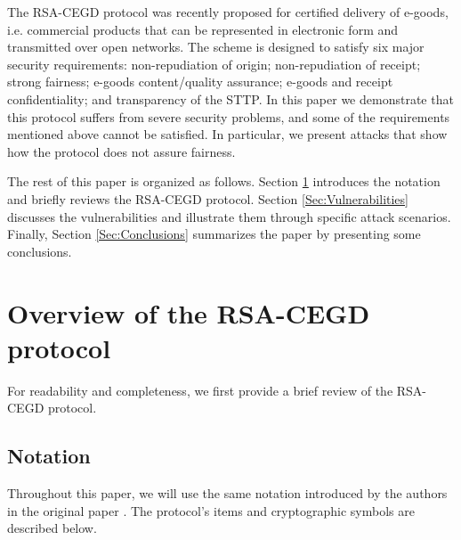 \documentclass{article}
\begin{document}
The RSA-CEGD protocol \cite{NZCG04} was recently proposed for
certified delivery of e-goods, i.e. commercial products that can be
represented in electronic form and transmitted over open networks.
The scheme is designed to satisfy six major security requirements:
non-repudiation of origin; non-repudiation of receipt; strong
fairness; e-goods content/quality assurance; e-goods and receipt
confidentiality; and transparency of the STTP. In this paper we
demonstrate that this protocol suffers from severe security
problems, and some of the requirements mentioned above cannot be
satisfied. In particular, we present attacks that show how the
protocol does not assure fairness.

The rest of this paper is organized as follows. Section
\ref{Sec:RSA-CEGD} introduces the notation and briefly reviews the
RSA-CEGD protocol. Section \ref{Sec:Vulnerabilities} discusses the
vulnerabilities and illustrate them through specific attack
scenarios. Finally, Section \ref{Sec:Conclusions} summarizes the
paper by presenting some conclusions.


\section{Overview of the RSA-CEGD protocol}\label{Sec:RSA-CEGD}
For readability and completeness, we first provide a brief review of
the RSA-CEGD protocol.

\subsection{Notation}
Throughout this paper, we will use the same notation introduced by
the authors in the original paper \cite{NZCG04}. The protocol's
items and cryptographic symbols are described below.
\end{document}
